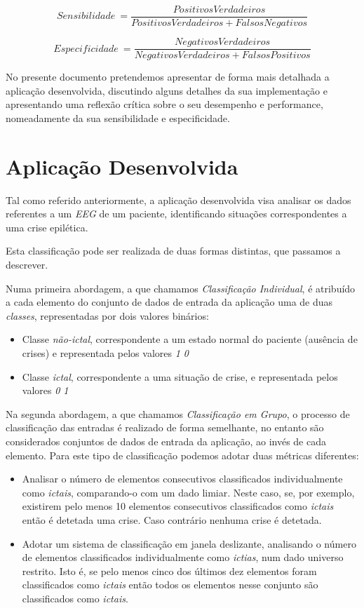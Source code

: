 \documentclass{article}
\begin{document}
$$Sensibilidade \: = \frac{PositivosVerdadeiros}{PositivosVerdadeiros + FalsosNegativos}$$

$$Especificidade \: = \frac{NegativosVerdadeiros}{NegativosVerdadeiros + FalsosPositivos}$$

\vspace{.1cm}

No presente documento pretendemos apresentar de forma mais detalhada a aplicação desenvolvida, discutindo alguns detalhes da sua implementação e apresentando uma reflexão crítica sobre o seu desempenho e performance, nomeadamente da sua sensibilidade e especificidade.

\pagebreak

\section{Aplicação Desenvolvida}

Tal como referido anteriormente, a aplicação desenvolvida visa analisar os dados referentes a um \emph{EEG} de um paciente, identificando situações correspondentes a uma crise epilética.

Esta classificação pode ser realizada de duas formas distintas, que passamos a descrever.

Numa primeira abordagem, a que chamamos \emph{Classificação Individual}, é atribuído a cada elemento do conjunto de dados de entrada da aplicação uma de duas \emph{classes}, representadas por dois valores binários:

\begin{itemize}
\item Classe \emph{não-ictal}, correspondente a um estado normal do paciente (ausência de crises) e representada pelos valores \emph{1 0}

\item Classe \emph{ictal}, correspondente a uma situação de crise, e representada pelos valores \emph{0 1}
\end{itemize}

Na segunda abordagem, a que chamamos \emph{Classificação em Grupo}, o processo de classificação das entradas é realizado de forma semelhante, no entanto são considerados conjuntos de dados de entrada da aplicação, ao invés de cada elemento. Para este tipo de classificação podemos adotar duas métricas diferentes:

\begin{itemize}
\item Analisar o número de elementos consecutivos classificados individualmente como \emph{ictais}, comparando-o com um dado limiar. Neste caso, se, por exemplo, existirem pelo menos 10 elementos consecutivos classificados como \emph{ictais} então é detetada uma crise. Caso contrário nenhuma crise é detetada.

\item Adotar um sistema de classificação em janela deslizante, analisando o número de elementos classificados individualmente como \emph{ictias}, num dado universo restrito. Isto é, se pelo menos cinco dos últimos dez elementos foram classificados como \emph{ictais} então todos os elementos nesse conjunto são classificados como \emph{ictais}.
\end{itemize}
\end{document}
